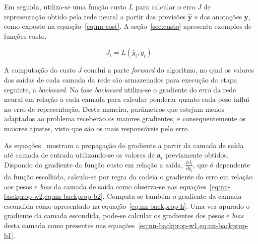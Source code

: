 Em seguida, utiliza-se uma função custo $L$ para calcular o erro $J$ de representação obtido pela rede neural a partir
das previsões $\mathbf{\hat{y}}$ e das anotações $\mathbf{y}$, como exposto na equação~\ref{eq:nn-cost}.
A seção~\ref{sec:custo} apresenta exemplos de funções custo.

\begin{equation} \label{eq:nn-cost}
    J_i = L(\hat{y}_i, y_i)
\end{equation}

A computação do custo $J$ conclui a parte \textit{forward} do algoritmo, no qual os valores das saídas de cada camada da
rede são armazenados para execução da etapa seguinte, a \textit{backward}.
Na fase \textit{backward} utiliza-se o gradiente do erro da rede neural em relação a cada camada para calcular ponderar
quanto cada peso influi no erro de representação.
Desta maneira, parâmetros que estejam menos adaptados ao problema receberão os maiores gradientes, e consequentemente os
maiores ajustes, visto que são os mais responsáveis pelo erro.

As equações~ mostram a propagação do gradiente a partir da camada de
saída até camada de entrada utilizando-se os valores de $\mathbf{a}_i$ previamente obtidos.
Dispondo do gradiente da função custo em relação a saída, $\frac{\partial{J_i}}{\partial{y_i}}$, que é dependente da
função escolhida, calcula-se por regra da cadeia o gradiente do erro em relação aos pesos e \textit{bias} da camada de
saída como observa-se nas equações~\cref{eq:nn-backprop-w2,eq:nn-backprop-b2}.
Computa-se também o gradiente da camada escondida como apresentado na equação~\ref{eq:nn-backprop-h}.
Uma vez apurado o gradiente da camada escondida, pode-se calcular os gradientes dos pesos e \textit{bias} desta camada
como presentes nas equações~\cref{eq:nn-backprop-w1,eq:nn-backprop-b1}.

